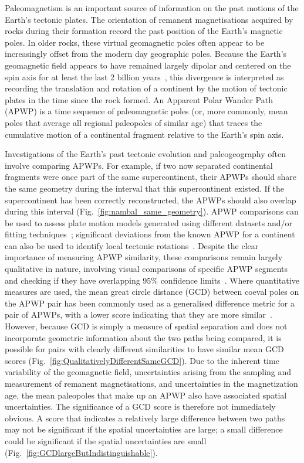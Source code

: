 Paleomagnetism is an important source of information on the past motions of the
Earth's tectonic plates. The orientation of remanent magnetisations acquired by
rocks during their formation record the past position of the Earth's magnetic
poles. In older rocks, these virtual geomagnetic poles often appear to be
increasingly offset from the modern day geographic poles. Because the Earth's
geomagnetic field appears to have remained largely dipolar and centered on the
spin axis for at least the last 2 billion years~\citep{E06}, this divergence is
interpreted as recording the translation and rotation of a continent by the
motion of tectonic plates in the time since the rock formed. An Apparent Polar
Wander Path (APWP) is a time sequence of paleomagnetic poles (or, more commonly,
mean poles that average all regional paleopoles of similar age) that traces
the cumulative motion of a continental fragment relative to the Earth's spin
axis.

Investigations of the Earth's past tectonic evolution and paleogeography often
involve comparing APWPs. For example, if two now separated continental fragments
were once part of the same supercontinent, their APWPs should share the same
geometry during the interval that this supercontinent existed. If the
supercontinent has been correctly reconstructed, the APWPs should also overlap
during this interval (Fig.~\ref{fig:nambal_same_geometry}). APWP comparisons can
be used to assess plate motion models generated using different datasets and/or
fitting techniques~\cite[for example]{B02,B07,S07,T08,D11}; significant
deviations from the known APWP for a continent can also be used to identify
local tectonic rotations~\cite[for example]{G10,Ch13}. Despite the clear
importance of measuring APWP similarity, these comparisons remain largely
qualitative in nature, involving visual comparisons of specific APWP segments
and checking if they have overlapping 95\% confidence limits~\cite[for
example]{B02,B07,G10,D11}. Where quantitative measures are used, the mean great
circle distance (GCD) between coeval poles on the APWP pair has been commonly
used as a generalised difference metric for a pair of APWPs, with a lower score
indicating that they are more similar~\cite[for example]{S07,T08}. However,
because GCD is simply a measure of spatial separation and does not incorporate
geometric information about the two paths being compared, it is possible for
pairs with clearly different similarities to have similar mean GCD scores
(Fig.~\ref{fig:QualitativelyDifferentSameGCD}). Due to the inherent time
variability of the geomagnetic field, uncertainties arising from the sampling
and measurement of remanent magnetisations, and uncertainties in the
magnetization age, the mean paleopoles that make up an APWP also have associated
spatial uncertainties. The significance of a GCD score is therefore not
immediately obvious. A score that indicates a relatively large difference
between two paths may not be significant if the spatial uncertainties are large;
a small difference could be significant if the spatial uncertainties are small
(Fig.~\ref{fig:GCDlargeButIndistinguishable}).


